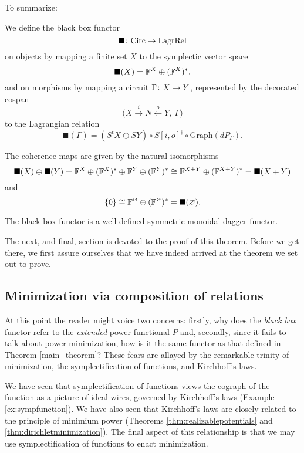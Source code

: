 To summarize:

\begin{definition}
  We define the black box functor 
  \[
    \blacksquare{\colon} \mathrm{Circ} \to \mathrm{LagrRel} 
  \]
  on objects by mapping a finite set $X$ to the symplectic vector space 
  \[
    \blacksquare(X) = {\mathbb F}^X \oplus ({\mathbb F}^X)^\ast.
  \]
  and on morphisms by mapping a circuit $\Gamma{\colon} X \to Y$, represented by the
  decorated cospan
  \[
    \big(X \stackrel{i}{\longrightarrow} N \stackrel{o}{\longleftarrow} Y,\:
    \Gamma\big)
  \]
  to the Lagrangian relation
  \[
    \blacksquare(\Gamma) = (S^t\!X \oplus SY) \circ S[i,o]^\dagger \circ
    \mathrm{Graph}(dP_\Gamma).
  \]
\end{definition}

The coherence maps are given by the natural isomorphisms
\[
  \blacksquare(X) \oplus \blacksquare(Y) = {\mathbb F}^X \oplus ({\mathbb F}^X)^\ast \oplus {\mathbb F}^Y
  \oplus ({\mathbb F}^Y)^\ast \cong {\mathbb F}^{X+Y} \oplus ({\mathbb F}^{X+Y})^\ast = \blacksquare(X+Y)
\]
and
  \[
    \{0\} \cong {\mathbb F}^\varnothing \oplus ({\mathbb F}^\varnothing)^\ast =
    \blacksquare(\varnothing).
  \]


\begin{theorem} \label{thm:main}
  The black box functor is a well-defined symmetric monoidal dagger functor.
\end{theorem}

The next, and final, section is devoted to the proof of this theorem. Before we
get there, we first assure ourselves that we have indeed arrived at the theorem
we set out to prove.

\subsection{Minimization via composition of relations}

At this point the reader might voice two concerns: firstly, why does the
\emph{black box} functor refer to the \emph{extended} power functional $P$ and,
secondly, since it fails to talk about power minimization, how is it the same
functor as that defined in Theorem \ref{main_theorem}? These fears are allayed
by the remarkable trinity of minimization, the symplectification of functions,
and Kirchhoff's laws. 

We have seen that symplectification of functions views the cograph of the
function as a picture of ideal wires, governed by Kirchhoff's laws (Example
\ref{ex:sympfunction}). We have also seen that Kirchhoff's laws are closely
related to the principle of minimium power (Theorems
\ref{thm:realizablepotentials} and \ref{thm:dirichletminimization}). The final
aspect of this relationship is that we may use symplectification of functions to
enact minimization.

